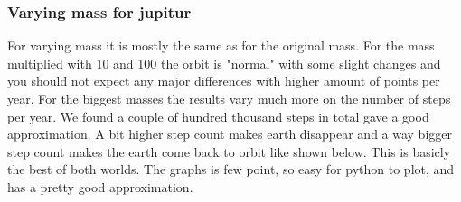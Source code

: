 \subsubsection{Varying mass for jupitur}

For varying mass it is mostly the same as for the original mass. For the mass multiplied with 10 and 100 the orbit is "normal" with some slight changes and you should not expect any major differences with higher amount of points per year. For the biggest masses the results vary much more on the number of steps per year. We found a couple of hundred thousand steps in total gave a good approximation. A bit higher step count makes earth disappear and a way bigger step count makes the earth come back to orbit like shown below. This is basicly the best of both worlds. The graphs is few point, so easy for python to plot, and has a pretty good approximation.

